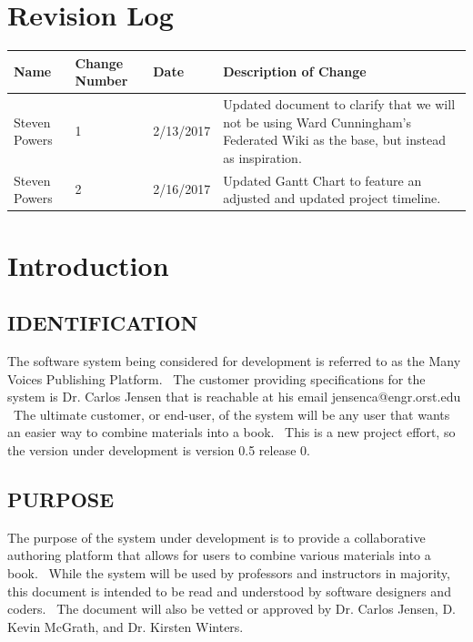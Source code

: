 \documentclass[onecolumn, draftclsnofoot,10pt, compsoc]{IEEEtran}
\begin{document}
\section{Revision Log}
\begin{flushleft}
\tablehead{}
\begin{supertabular}{|p{3cm}|p{3cm}|p{3cm}|p{7cm}|}
\hline
Name & Change Number & Date & Description of Change  
\\\hline
Steven Powers & 1 & 2/13/2017 & Updated document to clarify  that we will not be using Ward Cunningham's Federated Wiki as the base, but instead as inspiration.
\\\hline
Steven Powers & 2 & 2/16/2017 & Updated Gantt Chart to feature an adjusted and updated project timeline.
\\ \hline

\end{supertabular}
\end{flushleft}



\section[Introduction]{Introduction}

\subsection[IDENTIFICATION]{IDENTIFICATION}


{\noindent
The software system being considered for development is referred to as the Many Voices
Publishing Platform. \ The customer providing specifications
for the system is Dr. Carlos Jensen that is reachable at his email jensenca@engr.orst.edu \
The ultimate customer, or end-user, of the system will be any user that wants an easier
way to combine materials into a book. \ This is a new project effort, so the
version under development is version 0.5 release 0.}

\subsection[PURPOSE]{PURPOSE}

{\noindent
The purpose of the system under
development is to provide a collaborative authoring platform that allows for users to
combine various materials into a book. \ While the system will be used by professors and
instructors in majority, this document is intended to be read and understood by software
designers and coders. \ The document will also be vetted or
approved by Dr. Carlos Jensen, D. Kevin McGrath, and Dr. Kirsten Winters.}
\end{document}
